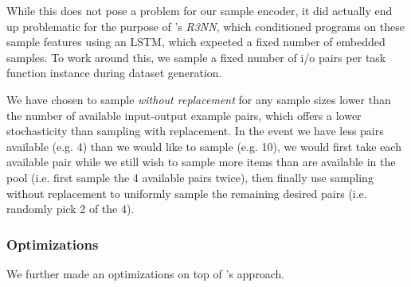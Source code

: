 \documentclass{article}
\begin{document}
    While this does not pose a problem for our sample encoder,
    it did actually end up problematic for the purpose of \citet{nsps}'s \emph{R3NN},
    which conditioned programs on these sample features using an LSTM,
    which expected a fixed number of embedded samples.
    To work around this,
    we sample a fixed number of i/o pairs per task function instance during dataset generation.

    We have chosen to sample \emph{without replacement} for any
    sample sizes lower than the number of available input-output example pairs,
    which offers a lower stochasticity than sampling with replacement.
    In the event we have less pairs available (e.g. 4) than we would like to sample (e.g. 10),
    we would first take each available pair while we still wish to sample more items than are available in the pool (i.e. first sample the 4 available pairs twice),
    then finally use sampling without replacement to uniformly sample the remaining desired pairs (i.e. randomly pick 2 of the 4).



\subsubsection{Optimizations}

We further made an optimizations on top of \citet{nsps}'s approach.
\end{document}
